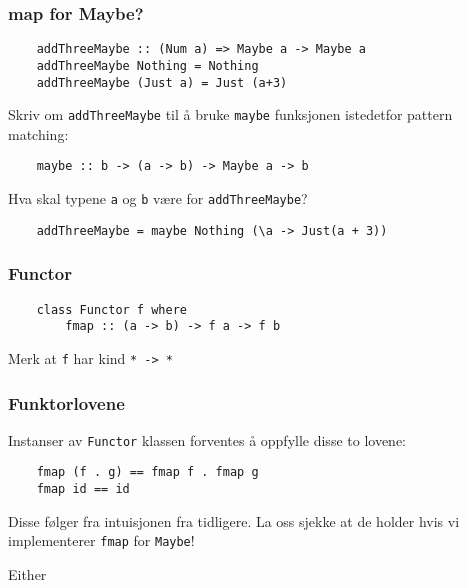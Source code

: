 \documentclass{article}
\begin{document}
    \subsubsection{map for Maybe?}  

    \begin{lstlisting}
    addThreeMaybe :: (Num a) => Maybe a -> Maybe a
    addThreeMaybe Nothing = Nothing
    addThreeMaybe (Just a) = Just (a+3)
    \end{lstlisting}

    Skriv om \texttt{addThreeMaybe} til å bruke \texttt{maybe} funksjonen istedetfor pattern matching:

    \begin{lstlisting}
    maybe :: b -> (a -> b) -> Maybe a -> b 
    \end{lstlisting}

    Hva skal typene \texttt{a} og \texttt{b} være for \texttt{addThreeMaybe}?

    \begin{lstlisting}
    addThreeMaybe = maybe Nothing (\a -> Just(a + 3))   
    \end{lstlisting}

    \subsubsection{Functor}
    \begin{lstlisting}
    class Functor f where 
        fmap :: (a -> b) -> f a -> f b 
    \end{lstlisting}

    Merk at \texttt{f} har kind \texttt{* -> *}

    \subsubsection{Funktorlovene}
    Instanser av \texttt{Functor} klassen forventes å oppfylle disse to lovene:

    \begin{lstlisting}
    fmap (f . g) == fmap f . fmap g
    fmap id == id
    \end{lstlisting}

    Disse følger fra intuisjonen fra tidligere.
    La oss sjekke at de holder hvis vi implementerer \texttt{fmap} for \texttt{Maybe}!

    \begin{eg}
        Either
        \medskip

    \end{eg}
\end{document}
